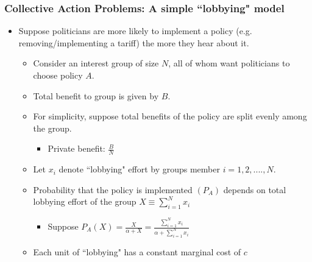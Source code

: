 \documentclass{beamer}
\begin{document}
\begin{frame}
	\frametitle{Collective Action Problems: A simple ``lobbying" model}

\begin{itemize}
	\item Suppose politicians are more likely to implement a policy (e.g. removing/implementing a tariff) the more they hear about it.
		\begin{itemize}
			\item Consider an interest group of size $N$, all of whom want politicians to choose policy $A$. 
			\item Total benefit to group is given by $B$.
			\item For simplicity, suppose total benefits of the policy are split evenly among the group.
				\begin{itemize}
					\item Private benefit: $\frac{B}{N}$
				\end{itemize}
			\item Let $x_i$ denote ``lobbying" effort by groups member $i=1,2,....,N$.
			\item Probability that the policy is implemented $(P_A)$ depends on total lobbying effort of the group $X\equiv \sum^N_{i=1}x_i$ 
				\begin{itemize}
					\item Suppose $P_A(X)=\frac{X}{\alpha + X}=\frac{\sum^N_{i=1}x_i}{\alpha + \sum^N_{i=1}x_i}$
				\end{itemize}
			\item Each unit of ``lobbying" has a constant marginal cost of $c$
		\end{itemize}
\end{itemize}


\end{frame}
\end{document}
